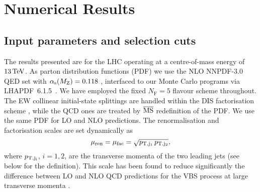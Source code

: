 \documentclass[a4article,11pt]{article}
\begin{document}
\section{Numerical Results}
\label{sec:results}

\subsection{Input parameters and selection cuts}
\label{ssec:InputParameters}

The results presented are for the LHC operating at a centre-of-mass
energy of $13\,\text{TeV}$.  
As parton distribution functions (PDF) we use the
NLO NNPDF-3.0 QED set with $\alpha_\text{s}(M_\text{Z}) =
0.118$ \cite{Ball:2013hta,Ball:2014uwa}, 
interfaced to our Monte Carlo
programs via LHAPDF~6.1.5~\cite{Andersen:2014efa,Buckley:2014ana}.  
We have employed the fixed $N_\text{F}=5$ flavour scheme throughout.
The EW collinear initial-state splittings are handled within the DIS
factorisation scheme \cite{Diener:2005me,Dittmaier:2009cr}, while the
QCD ones are treated by ${\overline{\rm MS}}$ redefinition of the PDF.
We use the same PDF for LO and NLO predictions.
The renormalisation and factorisation scales are set dynamically as
%
\begin{equation}
\label{eq:defscale}
 \mu_{\rm ren} = \mu_{\rm fac} = \sqrt{p_{\rm T, j_1}\, p_{\rm T, j_2}},
\end{equation}
%
where $p_{\rm T, j_i}$, $i=1,2$, are the transverse momenta of the two leading
jets (see below for the definition).  This scale has been found to
reduce significantly the difference between LO and NLO QCD predictions
for the VBS process at large transverse momenta \cite{Denner:2012dz}.
\end{document}
